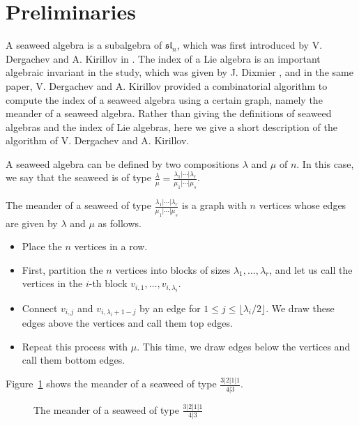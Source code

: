 \documentclass[reqno]{amsart}
\theoremstyle{definition}
\begin{document}
\section{Preliminaries}\label{sec2}

A seaweed algebra is a subalgebra of $\mathfrak{sl}_n$, which was first introduced by V. Dergachev and A. Kirillov in \cite{dergachevkirillov}. The index of a Lie algebra is an important algebraic invariant in the study, which was given by J. Dixmier \cite{dixmier}, and  in the same paper, V. Dergachev and A. Kirillov  provided a combinatorial algorithm to compute the index of a seaweed algebra using a certain graph, namely the meander of a seaweed algebra.  Rather than giving the definitions of seaweed algebras and the index of Lie algebras, here we give a short description of the algorithm of V. Dergachev and A. Kirillov.  

A seaweed algebra can be defined by two compositions $\lambda$ and $\mu$ of $n$. In this case, we say that the seaweed is of type $\frac{\lambda}{\mu}=\frac{\lambda_1| \cdots | \lambda_{r}}{\mu_1|\cdots | \mu_s}$. 

The meander of a seaweed of type $\frac{\lambda_1| \cdots | \lambda_{r}}{\mu_1|\cdots | \mu_s}$ is a graph with $n$ vertices whose edges are given by $\lambda$ and $\mu$ as follows. 
\begin{itemize}
\item Place the $n$ vertices in a row.
\item First, partition the $n$ vertices into blocks of sizes $\lambda_1,\ldots, \lambda_r$, and let us call the vertices in the $i$-th block $v_{i,1},\ldots, v_{i,\lambda_i}$.
\item Connect $v_{i,j}$ and $v_{i,\lambda_{i}+1-j}$  by an edge for $1\le j\le \lfloor \lambda_i/2 \rfloor$. We draw these edges above the vertices and call them top edges.
\item Repeat this process with $\mu$. This time, we draw edges below the vertices and call them bottom edges.
\end{itemize}

Figure~\ref{fig1} shows the meander of a seaweed of type $\frac{3|2|1|1}{4|3}$.

\begin{figure}[ht]
\caption{The meander of a seaweed of type $\frac{3|2|1|1}{4|3}$}\label{fig1}
\end{figure} 
\end{document}
